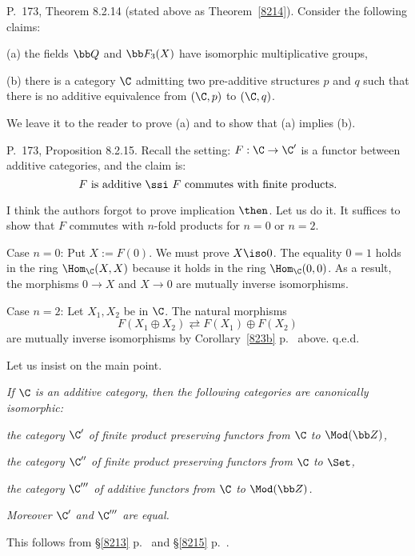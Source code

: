 \documentclass[12pt]{article}
\theoremstyle{remark}
\theoremstyle{definition}
\begin{document}
%

\begin{s}
P.~173, Theorem 8.2.14 (stated above as Theorem~\ref{8214}). Consider the following claims:

\nn(a) the fields $\bb Q$ and $\bb F_3(X)$ have isomorphic multiplicative groups,

\nn(b) there is a category $\C$ admitting two pre-additive structures $p$ and $q$ such that there is no additive equivalence from $(\C,p)$ to $(\C,q)$. 

We leave it to the reader to prove (a) and to show that (a) implies (b).
\end{s}

%

\begin{s}
P.~173, Proposition 8.2.15. Recall the setting: $F:\C\to\C'$ is a functor between additive categories, and the claim is: 
$$
F\text{ is additive }\ssi\ F\text{ commutes with finite products}.
$$ 

I think the authors forgot to prove implication $\then$. Let us do it. It suffices to show that $F$ commutes with $n$-fold products for $n=0$ or $n=2$. 

Case $n=0$: Put $X:=F(0)$. We must prove $X\iso 0$. The equality $0=1$ holds in the ring $\Hom_\C(X,X)$ because it holds in the ring $\Hom_\C(0,0)$. As a result, the morphisms $0\to X$ and $X\to 0$ are mutually inverse isomorphisms. 

Case $n=2$: Let $X_1,X_2$ be in $\C$. The natural morphisms 
$$
F(X_1\oplus X_2)\rightleftarrows F(X_1)\oplus F(X_2)
$$ 
are mutually inverse isomorphisms by Corollary~\ref{823b} p.~ above. q.e.d.
\end{s}

%

\begin{s}
Let us insist on the main point. 

\nn\emph{If $\C$ is an additive category, then the following categories are canonically isomorphic:}

\emph{the category $\C'$ of finite product preserving functors from $\C$ to $\Mod(\bb Z)$,}

\emph{the category $\C''$ of finite product preserving functors from $\C$ to $\Set$,}

\emph{the category $\C'''$ of additive functors from $\C$ to $\Mod(\bb Z)$.}

\nn\emph{Moreover $\C'$ and $\C'''$ are equal.}

\nn This follows from \S\ref{8213} p.~ and \S\ref{8215} p.~.
\end{s}
\end{document}
